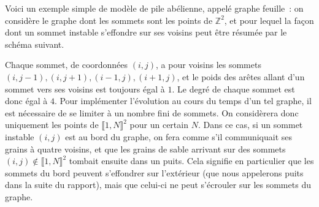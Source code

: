 \documentclass{article}
\begin{document}
Voici un exemple simple de modèle de pile abélienne, appelé graphe feuille : on considère le graphe dont les sommets sont les points de $\mathbb{Z}^2$, et pour lequel la façon dont un sommet instable s'effondre sur ses voisins peut être résumée par le schéma suivant.
\begin{center}\end{center}
Chaque sommet, de coordonnées $(i,j)$, a pour voisins les sommets $(i,j-1),(i,j+1),(i-1,j),(i+1,j)$, et le poids des arêtes allant d'un sommet vers ses voisins est toujours égal à $1$. Le degré de chaque sommet est donc égal à $4$. Pour implémenter l'évolution au cours du temps d'un tel graphe, il est nécessaire de se limiter à un nombre fini de sommets. On considèrera donc uniquement les points de $\llbracket1,N\rrbracket^2$ pour un certain $N$. Dans ce cas, si un sommet instable $(i,j)$ est au bord du graphe, on fera comme s'il communiquait ses grains à quatre voisins, et que les grains de sable arrivant sur des sommets $(i,j) \notin \llbracket 1,N\rrbracket^2$ tombait ensuite dans un puits. Cela signifie en particulier que les sommets du bord peuvent s'effondrer sur l'extérieur (que nous appelerons puits dans la suite du rapport), mais que celui-ci ne peut s’écrouler sur les sommets du graphe.
\end{document}
